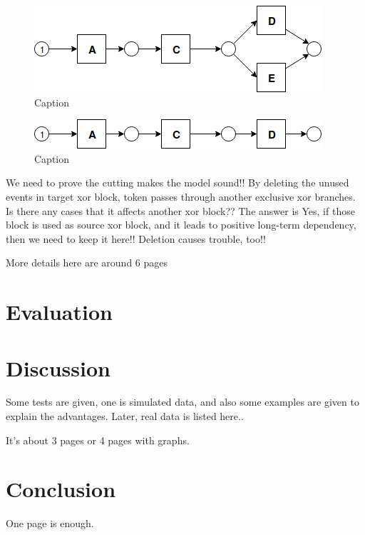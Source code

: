 \documentclass[]{article}
\begin{document}
\begin{figure}
	\centering
	\includegraphics{images/LT_Seq_01_Silent_02_AfterDeletion.png}
	\caption{Caption}
	\label{fig:seq-2-silent-5}
\end{figure}
\begin{figure}
	\centering
	\includegraphics{images/LT_Seq_01_Silent_04_AfterDeletion.png}
	\caption{Caption}
	\label{fig:seq-2-silent-6}
\end{figure}
We need to prove the cutting makes the model sound!! By deleting the unused events in target xor block, token passes through another exclusive xor branches. 
Is there any cases that it affects another xor block?? The answer is Yes, if those block is used as source xor block, and it leads to positive long-term dependency, then we need to keep it here!! Deletion causes trouble, too!!  
\fi

More details here are around 6 pages
\section{Evaluation}
\section{Discussion}


Some tests are given, one is simulated data, and also some examples are given to explain the advantages. Later, real data is listed here.. 

It's about 3 pages or 4 pages with graphs. 


\section{Conclusion}
One page is enough. 
\pagebreak


\end{document}
